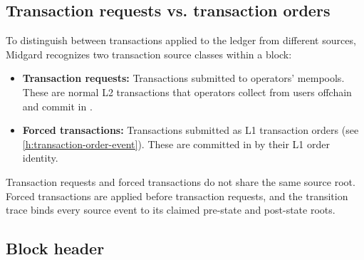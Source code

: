 \documentclass[../midgard.tex]{subfiles}
\begin{document}
\subsection{Transaction requests vs. transaction orders}
\label{h:tx-requests-vs-tx-orders}

To distinguish between transactions applied to the ledger from different sources, Midgard recognizes two transaction source classes within a block:
\begin{itemize}
    \item \textbf{Transaction requests:} Transactions submitted to operators' mempools. These are normal L2 transactions that operators collect from users offchain and commit in .
    \item \textbf{Forced transactions:} Transactions submitted as L1 transaction orders (see \cref{h:transaction-order-event}). These are committed in  by their L1 order identity.
\end{itemize}

Transaction requests and forced transactions do not share the same source root.
Forced transactions are applied before transaction requests, and the transition trace binds every source event to its claimed pre-state and post-state roots.

\subsection{Block header}
\label{h:block-header}
\end{document}

